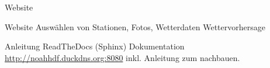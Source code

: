\begin{frame}[t]{Website}
  \begin{block}{Website}
    Auswählen von Stationen, Fotos, Wetterdaten
    Wettervorhersage
  \end{block}
  \begin{block}{Anleitung}
    ReadTheDocs (Sphinx) Dokumentation
    \url{http://noahhdf.duckdns.org:8080}
    inkl. Anleitung zum nachbauen.
  \end{block}
\end{frame}
